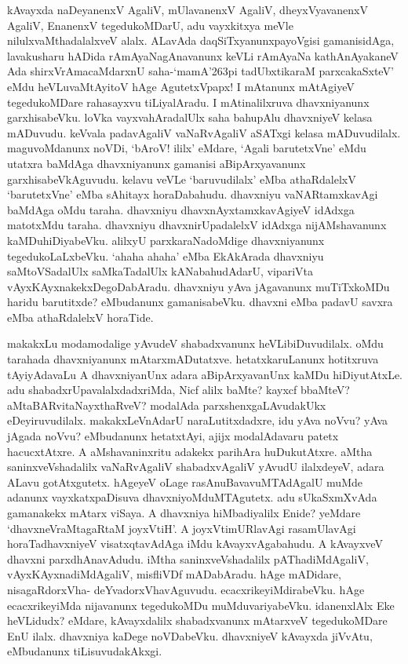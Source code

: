 \noindent
kAvayxda naDeyanenxV AgaliV, mUlavanenxV AgaliV, dheyxVyavanenxV AgaliV, EnanenxV tegedukoMDarU, adu vayxkitxya meVle nilulxvaMthadalalxveV alalx. ALavAda daqSiTxyanunxpayoVgisi gamanisidAga, lavakusharu hADida rAmAyaNagAnavanunx keVLi rAmAyaNa kathAnAyakaneV Ada shirxVrAmacaMdarxnU saha-`ma\-mA\char'263pi tadUbxtikaraM\label{236} parxcakaSxteV' eMdu heVLuvaMtAyitoV hAge AgutetxVpapx! I mAtanunx mAtAgiyeV tegedukoMDare rahasayxvu tiLiyalAradu. I mAtinalilxruva dhavxniyanunx garxhisabeVku. loVka vayxva\-hAra\-dalUlx saha bahupAlu dhavxniyeV kelasa mADuvudu. keVvala padavAgaliV vaNaRvAgaliV aSATxgi kelasa\- mADuvudilalx. maguvoMdanunx noVDi, `bAroV! ililx' eMdare, `Agali barutetxVne' eMdu utatxra baMdAga dhavxniyanunx gamanisi aBipArxyavanunx garxhisabeVkAguvudu. kelavu veVLe `baruvudilalx' eMba athaRdalelxV `barutetxVne' eMba sAhitayx horaDabahudu. dhavxniyu vaNARtamxkavAgi baMdAga oMdu taraha. dhavxniyu dhavxnAyxtamxkavAgiyeV idAdxga matotxMdu taraha. dhavxniyu dhavxnirUpadalelxV idAdxga nijAMshavanunx kaMDuhiDiyabeVku. alilxyU parxkaraNadoMdige dhavxniyanunx tegedukoLaLxbeVku. `ahaha ahaha' eMba EkAkArada dhavxniyu saMtoVSadalUlx saMkaTadalUlx kANabahudAdarU, vipariVta vAyxKAyxnakekxDegoDa\-bAradu. dhavxniyu yAva jAgavanunx muTiTxkoMDu haridu barutitxde? eMbudanunx gamanisabeVku. dhavxni eMba padavU savxra eMba athaRdalelxV horaTide.

\medskip

makakxLu modamodalige yAvudeV shabadxvanunx heVLibiDuvudilalx. oMdu tara\-hada dhavxniyanunx mAtarx\-mADutatxve. hetatxkaruLanunx hotitxruva tAyiyAdavaLu A dhavxniyanUnx adara aBipArxyavanUnx kaMDu\- hiDiyutAtxLe. adu shabadxrUpa\-valalxdadxriMda, Nicf alilx baMte? kayxcf bbaMteV? aMtaBARvitaNayxthaRveV? modalAda parxshenxgaLAvudakUkx eDeyiruvudilalx. makakxLeVnAdarU naraLutitxdadxre, idu yAva noVvu? yAva jAgada noVvu? eMbudanunx hetatxtAyi, ajijx modalAdavaru patetx hacucxtAtxre. A aMshava\-ninxritu adakekx parihAra huDukutAtxre. aMtha saninxveVshadalilx vaNaRvAgaliV shabadxvAgaliV yAvudU ilalxdeyeV, adara ALavu gotAtxgutetx. hAgeyeV oLage rasAnuBavavuMTAdAgalU muMde adanunx vayxkatxpaDi\-suva dhavxniyoMduMTAgutetx. adu sUkaSxmXvAda gamanakekx mAtarx viSaya. A dhavxniya hiMbadi\-yalilx Enide? yeMdare `dhavxneVraMtagaRtaM joyxVtiH'\label{152}. A joyxVtimURlavAgi rasamUlavAgi horaTa\-dhavxniyeV visatxqtavAdAga iMdu kAvayxvAgabahudu. A kAvayxveV dhavxni parxdhAnavAdudu. iMtha saninx\-veVshadalilx pAThadiMdAgaliV, vAyxKAyxnadiMdAgaliV, misfliVDf mADabAradu. hAge mADidare, nisagaR\-dorxVha- deYvadorxVhavAguvudu. ecacxrikeyiMdirabeVku. hAge ecacxrikeyiMda nijavanunx tegedukoMDu muMduvariyabeVku. idanenxlAlx Eke heVLidudx? eMdare, kAvayxdalilx shabadxvanunx mAtarxveV tegedukoMDare EnU ilalx. dhavxniya kaDege noVDabeVku. dhavxniyeV kAvayxda jiVvAtu, eMbudanunx tiLisuvudakAkxgi.

